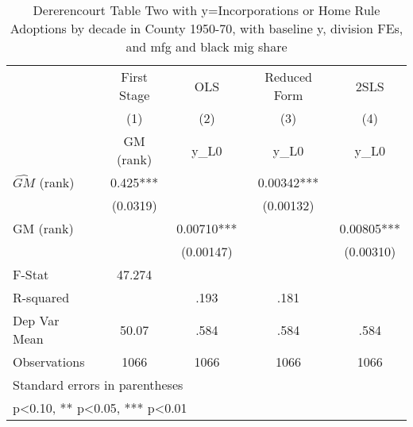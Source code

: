 \begin{table}[htbp]\centering
\def\sym#1{\ifmmode^{#1}\else\(^{#1}\)\fi}
\caption{Dererencourt Table Two with y=Incorporations or Home Rule Adoptions by decade in County 1950-70, with baseline y, division FEs, and mfg and black mig share}
\begin{tabular}{l*{4}{c}}
\toprule
                    & First Stage   &         OLS   &Reduced Form   &        2SLS   \\
                    &\multicolumn{1}{c}{(1)}&\multicolumn{1}{c}{(2)}&\multicolumn{1}{c}{(3)}&\multicolumn{1}{c}{(4)}\\
                    &\multicolumn{1}{c}{GM  (rank)}&\multicolumn{1}{c}{y\_L0}&\multicolumn{1}{c}{y\_L0}&\multicolumn{1}{c}{y\_L0}\\
\midrule
$\hat{GM}$ (rank)   &       0.425***&               &     0.00342***&               \\
                    &    (0.0319)   &               &   (0.00132)   &               \\
\addlinespace
GM  (rank)          &               &     0.00710***&               &     0.00805***\\
                    &               &   (0.00147)   &               &   (0.00310)   \\
\midrule
F-Stat              &      47.274   &               &               &               \\
R-squared           &               &        .193   &        .181   &               \\
Dep Var Mean        &       50.07   &        .584   &        .584   &        .584   \\
Observations        &        1066   &        1066   &        1066   &        1066   \\
\bottomrule
\multicolumn{5}{l}{\footnotesize Standard errors in parentheses}\\
\multicolumn{5}{l}{\footnotesize * p<0.10, ** p<0.05, *** p<0.01}\\
\end{tabular}
\end{table}
